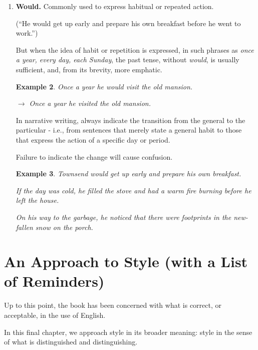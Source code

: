 \documentclass{book}
\numberwithin{equation}{section}
\newtheorem{example}{Example}[chapter]
\begin{document}
\begin{enumerate}
    Use a stronger word.
    \begin{example}
        a worthwhile project $\to$ a promising (useful, valuable, exciting) project
    \end{example}
    \item \textbf{Would.} Commonly used to express habitual or repeated action.
    
    (``He would get up early and prepare his own breakfast before he went to work.'')
    
    But when the idea of habit or repetition is expressed, in such phrases as \textit{once a year, every day, each Sunday}, the past tense, without \textit{would}, is usually sufficient, and, from its brevity, more emphatic.
    \begin{example}
        Once a year he would visit the old mansion.
        
        $\to$ Once a year he visited the old mansion.
    \end{example}
    In narrative writing, always indicate the transition from the general to the particular - i.e., from sentences that merely state a general habit to those that express the action of a specific day or period.
    
    Failure to indicate the change will cause confusion.
    \begin{example}
        Townsend would get up early and prepare his own breakfast.
        
        If the day was cold, he filled the stove and had a warm fire burning before he left the house.
        
        On his way to the garbage, he noticed that there were footprints in the new-fallen snow on the porch.
    \end{example}
\end{enumerate}


\chapter{An Approach to Style (with a List of Reminders)}

Up to this point, the book has been concerned with what is correct, or acceptable, in the use of English.

In this final chapter, we approach style in its broader meaning: style in the sense of what is distinguished and distinguishing.
\end{document}
